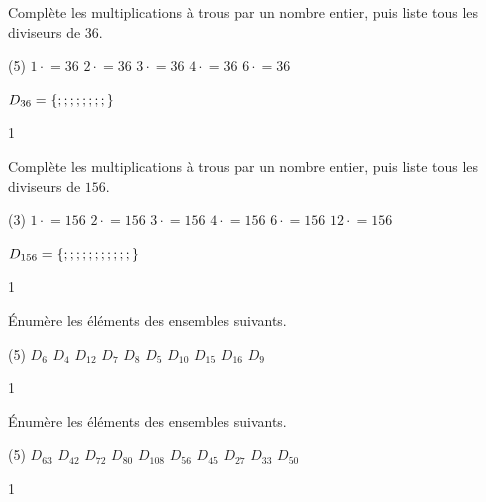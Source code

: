 \documentclass[a4paper,12pt]{report}
\begin{document}
\begin{exop}{
    Complète les multiplications à trous par un nombre entier, puis liste tous les diviseurs de $36$. 
    \begin{tasks}(5)
    \task[] $1\cdot$\hrulefill$=36$
    \task[] $2\cdot$\hrulefill$=36$
    \task[] $3\cdot$\hrulefill$=36$
    \task[] $4\cdot$\hrulefill$=36$
    \task[] $6\cdot$\hrulefill$=36$
    \end{tasks}   
$D_{36}=\{\hrulefill;\hrulefill;\hrulefill;\hrulefill;\hrulefill;\hrulefill;\hrulefill;\hrulefill;\hrulefill\}$
}{1}\end{exop}


\begin{exop}{
    Complète les multiplications à trous par un nombre entier, puis liste tous les diviseurs de $156$. 
    \vspace{-0.1cm}
    \begin{tasks}[after-item-skip=0.2em](3)
\task[] $1\cdot$\hrulefill$=156$ 
\task[] $2\cdot$\hrulefill$=156$ 
\task[] $3\cdot$\hrulefill$=156$ 
\task[] $4\cdot$\hrulefill$=156$ 
\task[] $6\cdot$\hrulefill$=156$ 
\task[] $12\cdot$\hrulefill$=156$
    \end{tasks}   
    \vspace{-0.1cm}
$D_{156}=\{\hrulefill;\hrulefill;\hrulefill;\hrulefill;\hrulefill;\hrulefill;\hrulefill;\hrulefill;\hrulefill;\hrulefill;\hrulefill;\hrulefill\}$
}{1}\end{exop}





\begin{exo}{
    Énumère les éléments des ensembles suivants.
    \vspace{-0.3cm}
\begin{tasks}[after-item-skip=0.2em](5)
    \task $D_6$
    \task $D_4$
    \task $D_{12}$
    \task $D_7$
    \task $D_8$
    \task $D_5$
    \task $D_{10}$
    \task $D_{15}$
    \task $D_{16}$
    \task $D_9$
\end{tasks}
}{1}\end{exo}

\begin{exo}{
    Énumère les éléments des ensembles suivants.
    \vspace{-0.3cm}
\begin{tasks}[after-item-skip=0.2em](5)
    \task $D_{63}$
    \task $D_{42}$
    \task $D_{72}$
    \task $D_{80}$
    \task $D_{108}$
    \task $D_{56}$
    \task $D_{45}$
    \task $D_{27}$
    \task $D_{33}$
    \task $D_{50}$
\end{tasks}
}{1}\end{exo}
\end{document}
